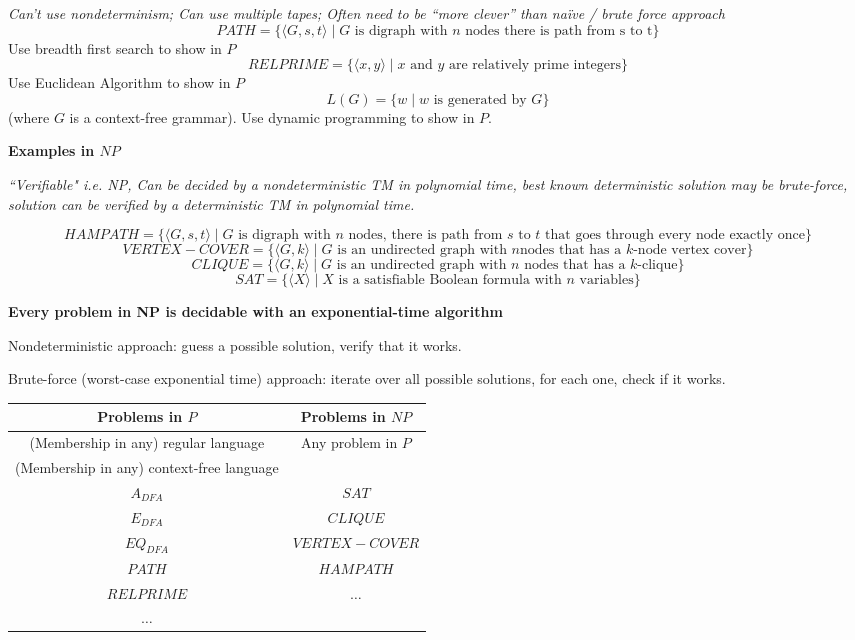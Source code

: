 \documentclass[12pt, oneside]{article}
\begin{document}
{\it Can't use nondeterminism; Can use multiple tapes; Often need to be “more clever” than naïve / brute force approach}
\[
    PATH = \{\langle G,s,t\rangle \mid \textrm{$G$ is digraph with $n$ nodes there is path from s to t}\}
\]
Use breadth first search to show in $P$
\[
    RELPRIME = \{ \langle x,y\rangle \mid \textrm{$x$ and $y$ are relatively prime integers}\}
\]
Use Euclidean Algorithm to show in $P$
\[
    L(G) = \{w \mid \textrm{$w$ is generated by $G$}\} 
\]
(where $G$ is a context-free grammar). Use dynamic programming to show in $P$.

\vfill
{\bf Examples in $NP$}

{\it ``Verifiable" i.e. NP, Can be decided by a nondeterministic TM in polynomial time,
best known deterministic solution may be brute-force, 
solution can be verified by a deterministic TM in polynomial time.}

\[
    HAMPATH = \{\langle G,s,t \rangle \mid \textrm{$G$ is digraph with $n$ nodes, there is path
from $s$ to $t$ that goes through every node exactly once}\}
\]
\[
    VERTEX-COVER = \{ \langle G,k\rangle \mid \textrm{$G$ is an undirected graph with $n$
nodes that has a $k$-node vertex cover}\}
\]
\[
    CLIQUE = \{ \langle G,k\rangle \mid \textrm{$G$ is an undirected graph with $n$ nodes that has a $k$-clique}\}
\]
\[
    SAT =\{ \langle X \rangle \mid \textrm{$X$ is a satisfiable Boolean formula with $n$ variables}\}
\]

\vfill
\newpage
{\bf Every problem in NP is decidable with an exponential-time algorithm}

Nondeterministic approach: guess a possible solution, verify that it works.

Brute-force (worst-case exponential time) approach: iterate over all possible solutions, for each 
one, check if it works.



\begin{center}
\begin{tabular}{c|c}
    {\bf Problems in $P$} & {\bf Problems in $NP$}\\
    \hline
    (Membership in any) regular language & Any problem in $P$ \\
    (Membership in any) context-free language &  \\
    $A_{DFA}$ & $SAT$\\
    $E_{DFA}$ & $CLIQUE$ \\
    $EQ_{DFA}$ & $VERTEX-COVER$ \\
    $PATH$ & $HAMPATH$ \\
    $RELPRIME$ &  $\ldots$ \\
$\ldots$ &\\
\end{tabular}
\end{center}
\end{document}
